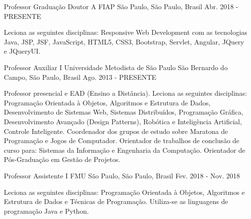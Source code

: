 

\begin{cventries}

  \cventry
    {Professor Graduação Doutor A} %
    {FIAP} %
    {São Paulo, São Paulo, Brasil} %
    {Abr. 2018 - PRESENTE} %
    {
      \begin{cvitems} %
        \item {Leciona as seguintes disciplinas: Responsive Web Development com as tecnologias Java, JSP, JSF, JavaScript, HTML5, CSS3, Bootstrap, Servlet, Angular, JQuery e JQueryUI.}
      \end{cvitems}
    }

  \cventry
    {Professor Auxiliar I} %
    {Universidade Metodista de São Paulo} %
    {São Bernardo do Campo, São Paulo, Brasil} %
    {Ago. 2013 - PRESENTE} %
    {
      \begin{cvitems} %
        \item {Professor presencial e EAD (Ensino a Distância). Leciona as seguintes disciplinas: Programação Orientada à Objetos, Algoritmos e Estrutura de Dados, Desenvolvimento de Sistemas Web, Sistemas Distribuídos, Programação Gráfica, Desenvolvimento Avançado (Design Patterns), Robótica e Inteligência Artificial, Controle Inteligente. Coordenador dos grupos de estudo sobre Maratona de Programação e Jogos de Computador. Orientador de trabalhos de conclusão de curso para: Sistemas da Informação e Engenharia da Computação. Orientador de Pós-Graduação em Gestão de Projetos.}
      \end{cvitems}
    }

  \cventry
    {Professor Assistente I} %
    {FMU} %
    {São Paulo, São Paulo, Brasil} %
    {Fev. 2018 - Nov. 2018} %
    {
      \begin{cvitems} %
        \item {Leciona as seguintes disciplinas: Programação Orientada à Objetos, Algoritmos e Estrutura de Dados e Técnicas de Programação. Utiliza-se as linguagens de programação Java e Python.}
      \end{cvitems}
    }


\end{cventries}

